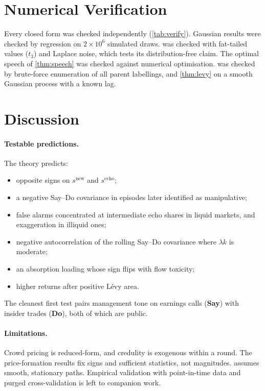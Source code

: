 \documentclass{article}
\theoremstyle{plain}
\theoremstyle{definition}
\theoremstyle{remark}
\newcommand{\SAY}{\textcolor{say}{\textsf{\textbf{Say}}}}
\newcommand{\DO}{\textcolor{do}{\textsf{\textbf{Do}}}}
\begin{document}
\section{Numerical Verification}\label{sec:verify}

Every closed form was checked independently (\cref{tab:verify}). Gaussian results were checked by regression on $2\times10^6$ simulated draws.  was checked with fat-tailed values ($t_3$) and Laplace noise, which tests its distribution-free claim. The optimal speech of \cref{thm:speech} was checked against numerical optimisation.  was checked by brute-force enumeration of all parent labellings, and \cref{thm:levy} on a smooth Gaussian process with a known lag.





\section{Discussion}\label{sec:discussion}

\paragraph{Testable predictions.} The theory predicts:
\begin{itemize}
  \item opposite signs on $s^{\mathrm{new}}$ and $s^{\mathrm{echo}}$;
  \item a negative Say--Do covariance in episodes later identified as manipulative;
  \item false alarms concentrated at intermediate echo shares in liquid markets, and exaggeration in illiquid ones;
  \item negative autocorrelation of the rolling Say--Do covariance where $\lambda k$ is moderate;
  \item an absorption loading whose sign flips with flow toxicity;
  \item higher returns after positive L\'evy area.
\end{itemize}
The cleanest first test pairs management tone on earnings calls (\SAY) with insider trades (\DO), both of which are public.

\paragraph{Limitations.} Crowd pricing is reduced-form, and credulity is exogenous within a round. The price-formation results fix signs and sufficient statistics, not magnitudes.  assumes smooth, stationary paths. Empirical validation with point-in-time data and purged cross-validation \citep{lopezdeprado2018,bailey2014dsr} is left to companion work.
\end{document}
